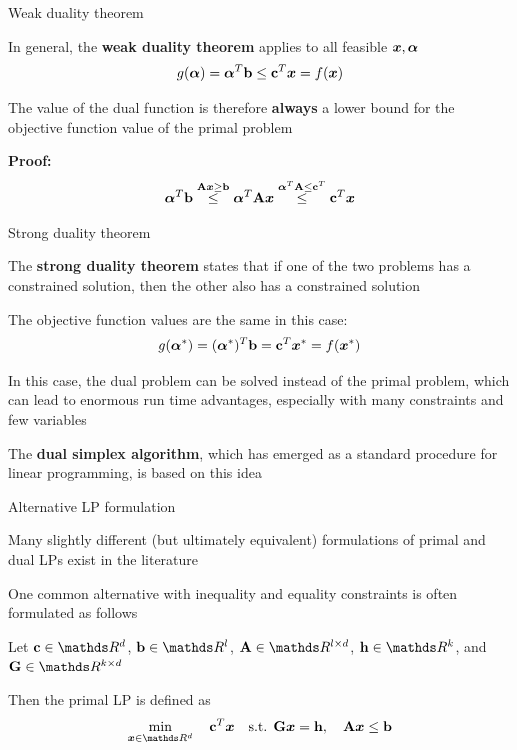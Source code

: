 \documentclass[11pt,compress,t,notes=noshow, xcolor=table]{beamer}
\begin{document}
\begin{framei}{Weak duality theorem}
\item In general, the \textbf{weak duality theorem} applies to all feasible $\bm{x}, \bm{\alpha}$
$$g(\bm{\alpha}) = \bm{\alpha}^T \mathbf{b} \le \mathbf{c}^T \bm{x} = f(\bm{x})$$
\item The value of the dual function is therefore \textbf{always} a lower bound for the objective function value of the primal problem
\vfill
\item[] \textbf{Proof:}
$$\bm{\alpha}^T \mathbf{b} \overset{\mathbf{A} \bm{x} \ge \mathbf{b}}{\le} \bm{\alpha}^T \mathbf{A} \bm{x} \overset{\bm{\alpha}^T \mathbf{A} \le \mathbf{c}^T}{\le} \mathbf{c}^T \bm{x}$$
\end{framei}


\begin{framei}{Strong duality theorem}
\item The \textbf{strong duality theorem} states that if one of the two problems has a constrained solution, then the other also has a constrained solution
\item The objective function values are the same in this case:
$$g(\bm{\alpha}^*) = (\bm{\alpha}^*)^T \mathbf{b} = \mathbf{c}^T \bm{x}^\ast = f(\bm{x}^\ast)$$
\vfill
\item In this case, the dual problem can be solved instead of the primal problem, which can lead to enormous run time advantages, especially with many constraints and few variables
\vfill
\item The \textbf{dual simplex algorithm}, which has emerged as a standard procedure for linear programming, is based on this idea
\end{framei}


\begin{framei}{Alternative LP formulation}
\item Many slightly different (but ultimately equivalent) formulations of primal and dual LPs exist in the literature
\item One common alternative with inequality and equality constraints is often formulated as follows
\item Let $\mathbf{c} \in \R^d$, $\bv \in \R^l$, $\Amat \in \R^{l \times d}$, $\mathbf{h} \in \R^k$, and $\mathbf{G} \in \R^{k \times d}$
\item Then the primal LP is defined as
$$\min_{\xv \in \R^d} \quad \mathbf{c}^T \xv \quad \text{s.t. } \mathbf{G} \xv = \mathbf{h}, \quad \Amat \xv \le \bv$$
\end{framei}
\end{document}
